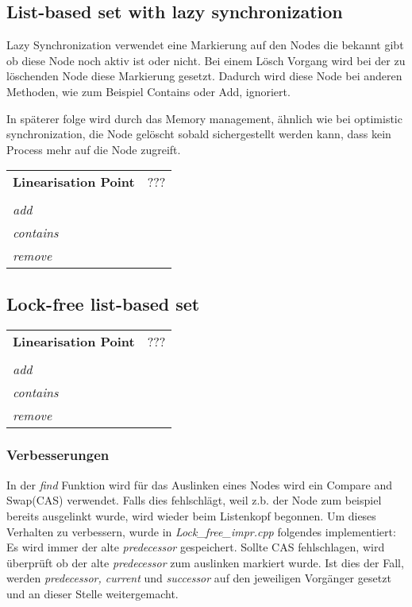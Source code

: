 \subsection{List-based set with lazy synchronization}

Lazy Synchronization verwendet eine Markierung auf den Nodes die bekannt gibt ob diese Node noch aktiv ist oder nicht. Bei einem Lösch Vorgang wird bei der zu löschenden Node diese Markierung gesetzt. Dadurch wird diese Node bei anderen Methoden, wie zum Beispiel Contains oder Add, ignoriert. 

In späterer folge wird durch das Memory management, ähnlich wie bei optimistic synchronization, die Node gelöscht sobald sichergestellt werden kann, dass kein Process mehr auf die Node zugreift.

\begin{table}[H]
    \begin{tabularx}{\textwidth}{lX}
        \textbf{Linearisation Point} & ???\\
        \\
        \textit{add} & \\
        \textit{contains} & \\
        \textit{remove} & \\
    \end{tabularx}
\end{table}

\subsection{Lock-free list-based set}

\begin{table}[H]
    \begin{tabularx}{\textwidth}{lX}
        \textbf{Linearisation Point} & ???\\
        \\
        \textit{add} & \\
        \textit{contains} & \\
        \textit{remove} & \\
    \end{tabularx}
\end{table}

\subsubsection{Verbesserungen}
\label{subsec:impr}
In der \textit{find} Funktion wird für das Auslinken eines Nodes wird ein Compare and Swap(CAS) verwendet. Falls dies fehlschlägt, 
weil z.b. der Node zum beispiel bereits ausgelinkt wurde,
wird wieder beim Listenkopf begonnen. Um dieses Verhalten zu verbessern, wurde in \textit{Lock\_free\_impr.cpp} folgendes implementiert:\\
Es wird immer der alte \textit{predecessor} gespeichert. Sollte CAS fehlschlagen, wird überprüft ob der alte \textit{predecessor}
zum auslinken markiert wurde. Ist dies der Fall, werden \textit{predecessor, current} und \textit{successor} auf den jeweiligen Vorgänger
gesetzt und an dieser Stelle weitergemacht. 